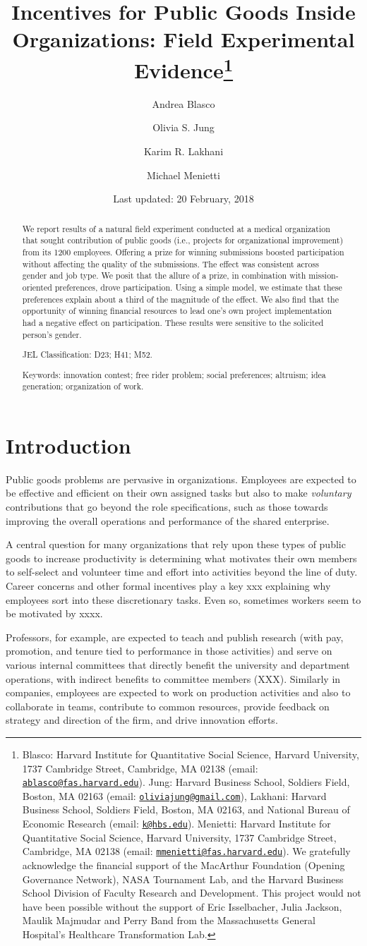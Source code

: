 \documentclass[12pt, titlepage]{article}
\title{Incentives for Public Goods Inside Organizations: Field Experimental
Evidence\thanks{Blasco: Harvard Institute for Quantitative Social Science, Harvard
University, 1737 Cambridge Street, Cambridge, MA 02138 (email:
\href{mailto:ablasco@fas.harvard.edu}{\nolinkurl{ablasco@fas.harvard.edu}}).
Jung: Harvard Business School, Soldiers Field, Boston, MA 02163 (email:
\href{mailto:oliviajung@gmail.com}{\nolinkurl{oliviajung@gmail.com}}),
Lakhani: Harvard Business School, Soldiers Field, Boston, MA 02163, and
National Bureau of Economic Research (email:
\href{mailto:k@hbs.edu}{\nolinkurl{k@hbs.edu}}). Menietti: Harvard
Institute for Quantitative Social Science, Harvard University, 1737
Cambridge Street, Cambridge, MA 02138 (email:
\href{mailto:mmenietti@fas.harvard.edu}{\nolinkurl{mmenietti@fas.harvard.edu}}).
We gratefully acknowledge the financial support of the MacArthur
Foundation (Opening Governance Network), NASA Tournament Lab, and the
Harvard Business School Division of Faculty Research and Development.
This project would not have been possible without the support of Eric
Isselbacher, Julia Jackson, Maulik Majmudar and Perry Band from the
Massachusetts General Hospital's Healthcare Transformation Lab.}}
\author{Andrea Blasco \and Olivia S. Jung \and Karim R. Lakhani \and Michael Menietti}
\date{Last updated: 20 February, 2018}
\begin{document}
\maketitle
\begin{abstract}
We report results of a natural field experiment conducted at a medical
organization that sought contribution of public goods (i.e., projects
for organizational improvement) from its 1200 employees. Offering a
prize for winning submissions boosted participation without affecting
the quality of the submissions. The effect was consistent across gender
and job type. We posit that the allure of a prize, in combination with
mission-oriented preferences, drove participation. Using a simple model,
we estimate that these preferences explain about a third of the
magnitude of the effect. We also find that the opportunity of winning
financial resources to lead one's own project implementation had a
negative effect on participation. These results were sensitive to the
solicited person's gender.

\smallskip\noindent 
JEL Classification: D23; H41; M52.

\smallskip\noindent 
Keywords: innovation contest; free rider problem; social preferences; altruism; idea generation; organization of work.
\end{abstract}


\clearpage
\tableofcontents
\setcounter{tocdepth}{2}
\clearpage

\section{Introduction}\label{introduction}

Public goods problems are pervasive in organizations. Employees are
expected to be effective and efficient on their own assigned tasks but
also to make \emph{voluntary} contributions that go beyond the role
specifications, such as those towards improving the overall operations
and performance of the shared enterprise.

A central question for many organizations that rely upon these types of
public goods to increase productivity is determining what motivates
their own members to self-select and volunteer time and effort into
activities beyond the line of duty. Career concerns and other formal
incentives play a key xxx explaining why employees sort into these
discretionary tasks. Even so, sometimes workers seem to be motivated by
xxxx.

Professors, for example, are expected to teach and publish research
(with pay, promotion, and tenure tied to performance in those
activities) and serve on various internal committees that directly
benefit the university and department operations, with indirect benefits
to committee members (XXX). Similarly in companies, employees are
expected to work on production activities and also to collaborate in
teams, contribute to common resources, provide feedback on strategy and
direction of the firm, and drive innovation efforts.
\end{document}
